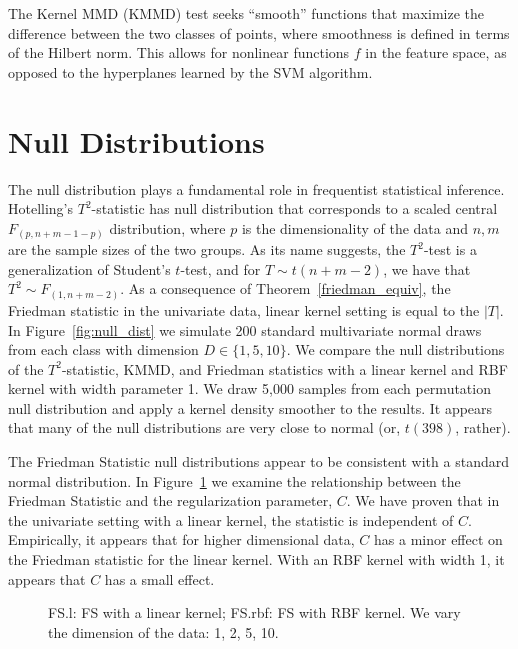 The Kernel MMD (KMMD) test seeks ``smooth'' functions that maximize
the difference between the two classes of points, where smoothness
is defined in terms of the Hilbert norm.  This allows for nonlinear
functions $f$ in the feature space, as opposed to the hyperplanes
learned by the SVM algorithm.

\section{Null Distributions}
The null distribution plays a fundamental role in frequentist statistical
inference.  Hotelling's $T^2$-statistic has null distribution that
corresponds to a scaled central $F_{(p, n+m-1-p)}$ distribution, where
$p$ is the dimensionality of the data and $n, m$ are the sample sizes
of the two groups.  As its name suggests, the $T^2$-test is a
generalization of Student's $t$-test, and for $T \sim t(n+m-2)$, we
have that $T^2 \sim F_{(1, n+m-2)}$.  As a consequence of
Theorem~\ref{friedman_equiv}, the Friedman statistic in the univariate
data, linear kernel setting is equal to the $|T|$.  In Figure~\ref{fig:null_dist} we simulate
200 standard multivariate normal draws from each class with dimension
$D \in \{1, 5, 10\}$.  We compare the null distributions of the
$T^2$-statistic, KMMD, and Friedman statistics with a linear kernel
and RBF kernel with width parameter 1.  We draw 5,000 samples from
each permutation null distribution and apply a kernel density smoother
to the results.  It appears that many of the null distributions are
very close to normal (or, $t(398)$, rather).

The Friedman Statistic null distributions appear to be consistent with
a standard normal distribution.  In Figure~\ref{fig:c_param} we
examine the relationship between the Friedman Statistic and the
regularization parameter, $C$.  We have proven that in the univariate
setting with a linear kernel, the statistic is independent of $C$.
Empirically, it appears that for higher dimensional data, $C$ has
a minor effect on the Friedman statistic for the linear kernel.
With an RBF kernel with width 1, it appears that $C$ has a small effect.
\begin{figure}
  \begin{center}
    \resizebox{14.0cm}{!}{
      
    }
  \end{center}
\caption{FS.l: FS with a linear kernel; FS.rbf: FS with RBF kernel. We vary
the dimension of the data: 1, 2, 5, 10.}
\label{fig:c_param}
\end{figure}

